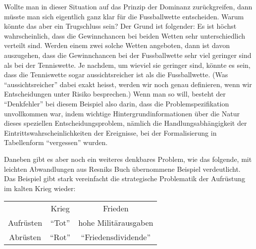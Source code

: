 Wollte man in dieser Situation auf das Prinzip der Dominanz zurückgreifen, dann
müsste man sich eigentlich ganz klar für die Fussballwette entscheiden. Warum
könnte das aber ein Trugschluss sein? Der Grund ist folgender: Es ist höchst
wahrscheinlich, dass die Gewinnchancen bei beiden Wetten sehr unterschiedlich
verteilt sind. Werden einem zwei solche Wetten angeboten, dann ist davon
auszugehen, dass die Gewinnchancen bei der Fussballwette sehr viel geringer
sind als bei der Tenniswette. Je nachdem, um wieviel sie geringer sind, könnte
es sein, dass die Tenniswette sogar aussichtsreicher ist als die Fussballwette.
(Was "`aussichtsreicher"' dabei exakt heisst, werden wir noch genau definieren,
wenn wir Entscheidungen unter Risiko besprechen.) Wenn man so will, besteht der
"`Denkfehler"' bei diesem Beispiel also darin, dass die Problemspezifikation
unvollkommen war, indem wichtige Hintergrundinformationen über die Natur dieses
speziellen Entscheidungsproblem,  nämlich die Handlungs\-abhängigkeit der
Eintrittswahrscheinlichkeiten der Ereignisse, bei der Formalisierung in
Tabellenform "`vergessen"' wurden.


Daneben gibt es aber noch ein weiteres denkbares Problem, wie das folgende, mit
leichten Abwandlungen aus Resniks Buch \cite[S.9 ]{resnik:1987} übernommene
Beispiel verdeutlicht. Das Beispiel gibt stark vereinfacht die strategische
Problematik der Aufrüstung im kalten Krieg wieder:

\begin{center}
\begin{tabular}{c|c|c|}
\multicolumn{1}{c}{ } & \multicolumn{1}{c}{Krieg}   & 
\multicolumn{1}{c}{Frieden}  \\ \cline{2-3} 
Aufrüsten & "`Tot"' & hohe Militärausgaben  \\ \cline{2-3} 
Abrüsten  & "`Rot"' & "`Friedensdividende"' \\ \cline{2-3}
\end{tabular}
\end{center}

